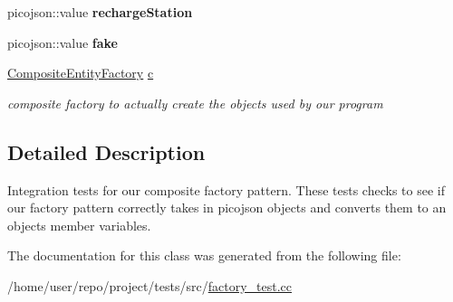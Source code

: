 \begin{DoxyCompactItemize}
\mbox{\label{classFactoryTest_a2ff2744762c80740ffc28a26ebb7873f}} 
picojson\+::value {\bfseries recharge\+Station}
\item 
\mbox{\label{classFactoryTest_aac81f20a5a2f99d7ffa57ce8e7bafebf}} 
picojson\+::value {\bfseries fake}
\item 
\mbox{\label{classFactoryTest_aa34ecf518b28d27c6be3a16e705a1208}} 
\hyperlink{classCompositeEntityFactory}{Composite\+Entity\+Factory} \hyperlink{classFactoryTest_aa34ecf518b28d27c6be3a16e705a1208}{c}
\begin{DoxyCompactList}\small\item\em composite factory to actually create the objects used by our program \end{DoxyCompactList}\end{DoxyCompactItemize}


\subsection{Detailed Description}
Integration tests for our composite factory pattern. These tests checks to see if our factory pattern correctly takes in picojson objects and converts them to an object\textquotesingle{}s member variables. 

The documentation for this class was generated from the following file\+:\begin{DoxyCompactItemize}
\item 
/home/user/repo/project/tests/src/\hyperlink{factory__test_8cc}{factory\+\_\+test.\+cc}\end{DoxyCompactItemize}

